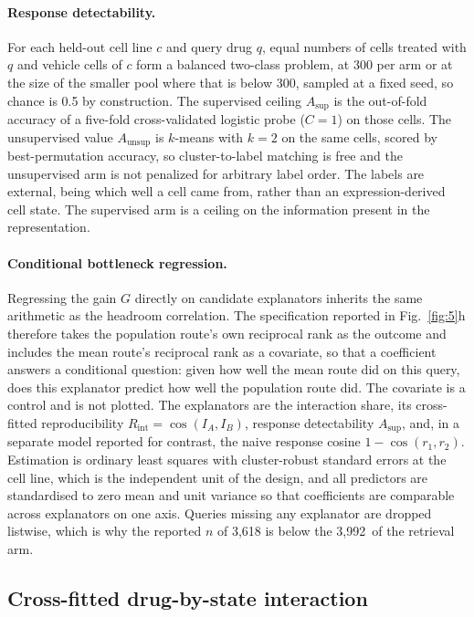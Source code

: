 \documentclass[11pt,letterpaper]{article}
\newcommand{\NQUERIES}{3,992}           %
\begin{document}
\paragraph{Response detectability.}
For each held-out cell line $c$ and query drug $q$, equal numbers of cells treated with $q$ and
vehicle cells of $c$ form a balanced two-class problem, at 300 per arm or at the size of the
smaller pool where that is below 300, sampled at a fixed seed, so chance is 0.5 by construction. The supervised ceiling $A_{\mathrm{sup}}$ is the out-of-fold accuracy of a
five-fold cross-validated logistic probe ($C=1$) on those cells. The unsupervised value
$A_{\mathrm{unsup}}$ is $k$-means with $k=2$ on the same cells, scored by best-permutation accuracy,
so cluster-to-label matching is free and the unsupervised arm is not penalized for arbitrary label
order. The labels are external, being which well a cell came from, rather than an expression-derived
cell state. The supervised arm is a ceiling on the information present in the representation.

\paragraph{Conditional bottleneck regression.}
Regressing the gain $G$ directly on candidate explanators inherits the same arithmetic as the
headroom correlation. The specification reported in Fig.~\ref{fig:5}h therefore takes the
population route's own reciprocal rank as the outcome and includes the mean route's reciprocal rank
as a covariate, so that a coefficient answers a conditional question: given how well the mean route
did on this query, does this explanator predict how well the population route did. The covariate is
a control and is not plotted. The explanators are the interaction share, its cross-fitted
reproducibility $R_{\mathrm{int}}=\cos(I_A,I_B)$, response detectability $A_{\mathrm{sup}}$, and,
in a separate model reported for contrast, the naive response cosine $1-\cos(r_1,r_2)$. Estimation is
ordinary least squares with cluster-robust standard errors at the cell line, which is the
independent unit of the design, and all predictors are standardised to zero mean and unit variance
so that coefficients are comparable across explanators on one axis. Queries missing any explanator
are dropped listwise, which is why the reported $n$ of 3,618 is below the \NQUERIES\ of the
retrieval arm.

\subsection*{Cross-fitted drug-by-state interaction}
\end{document}
